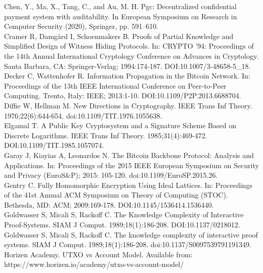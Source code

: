 \documentclass[10pt,a4paper,twocolumn]{article}
\begin{document}
Chen, Y., Ma, X., Tang, C., and Au, M. H. Pgc: Decentralized confidential payment system with auditability. In European Symposium on Research in Computer Security (2020), Springer, pp. 591–610.\\

Cramer R, Damgård I, Schoenmakers B. Proofs of Partial Knowledge and Simplified Design of Witness Hiding Protocols. In: CRYPTO '94: Proceedings of the 14th Annual International Cryptology Conference on Advances in Cryptology. Santa Barbara, CA: Springer-Verlag; 1994:174-187. DOI:10.1007/3-48658-5\_18.\\

Decker C, Wattenhofer R. Information Propagation in the Bitcoin Network. In: Proceedings of the 13th IEEE International Conference on Peer-to-Peer Computing. Trento, Italy: IEEE; 2013:1-10. DOI:10.1109/P2P.2013.6688704.\\

Diffie W, Hellman M. New Directions in Cryptography. IEEE Trans Inf Theory. 1976;22(6):644-654. doi:10.1109/TIT.1976.1055638.\\

Elgamal T. A Public Key Cryptosystem and a Signature Scheme Based on Discrete Logarithms. IEEE Trans Inf Theory. 1985;31(4):469-472. DOI:10.1109/TIT.1985.1057074.\\

Garay J, Kiayias A, Leonardos N. The Bitcoin Backbone Protocol: Analysis and Applications. In: Proceedings of the 2015 IEEE European Symposium on Security and Privacy (EuroS\&P); 2015: 105-120. doi:10.1109/EuroSP.2015.26.\\

Gentry C. Fully Homomorphic Encryption Using Ideal Lattices. In: Proceedings of the 41st Annual ACM Symposium on Theory of Computing (STOC). Bethesda, MD: ACM; 2009:169-178. DOI:10.1145/1536414.1536440.\\

Goldwasser S, Micali S, Rackoff C. The Knowledge Complexity of Interactive Proof-Systems. SIAM J Comput. 1989;18(1):186-208. DOI:10.1137/0218012.\\

Goldwasser S, Micali S, Rackoff C. The knowledge complexity of interactive proof systems. SIAM J Comput. 1989;18(1):186-208. doi:10.1137/S0097539791191349.\\

Horizen Academy. UTXO vs Account Model. Available from: https://www.horizen.io/academy/utxo-vs-account-model/ \\
\end{document}
